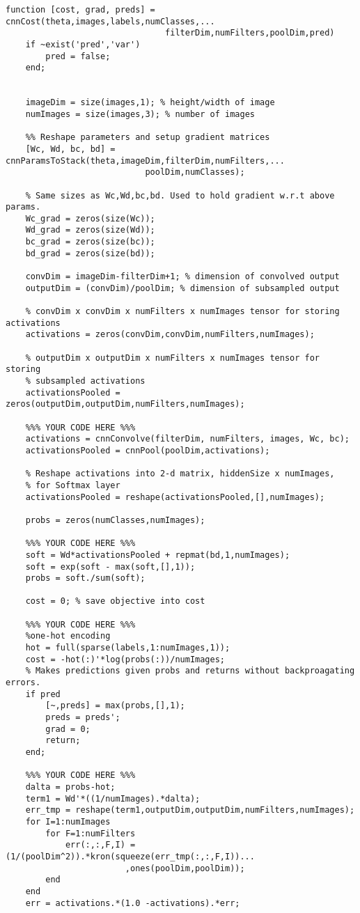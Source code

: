 \documentclass[12pt] {article}
\begin{document}
\begin{lstlisting}
function [cost, grad, preds] = cnnCost(theta,images,labels,numClasses,...
                                filterDim,numFilters,poolDim,pred)
	if ~exist('pred','var')
    	pred = false;
	end;


	imageDim = size(images,1); % height/width of image
	numImages = size(images,3); % number of images

	%% Reshape parameters and setup gradient matrices
	[Wc, Wd, bc, bd] = cnnParamsToStack(theta,imageDim,filterDim,numFilters,...
    	                    poolDim,numClasses);

	% Same sizes as Wc,Wd,bc,bd. Used to hold gradient w.r.t above params.
	Wc_grad = zeros(size(Wc));
	Wd_grad = zeros(size(Wd));
	bc_grad = zeros(size(bc));
	bd_grad = zeros(size(bd));

	convDim = imageDim-filterDim+1; % dimension of convolved output
	outputDim = (convDim)/poolDim; % dimension of subsampled output

	% convDim x convDim x numFilters x numImages tensor for storing activations
	activations = zeros(convDim,convDim,numFilters,numImages);

	% outputDim x outputDim x numFilters x numImages tensor for storing
	% subsampled activations
	activationsPooled = zeros(outputDim,outputDim,numFilters,numImages);

	%%% YOUR CODE HERE %%%
	activations = cnnConvolve(filterDim, numFilters, images, Wc, bc);
	activationsPooled = cnnPool(poolDim,activations);

	% Reshape activations into 2-d matrix, hiddenSize x numImages,
	% for Softmax layer
	activationsPooled = reshape(activationsPooled,[],numImages);

	probs = zeros(numClasses,numImages);

	%%% YOUR CODE HERE %%%
	soft = Wd*activationsPooled + repmat(bd,1,numImages);
	soft = exp(soft - max(soft,[],1));
	probs = soft./sum(soft);

	cost = 0; % save objective into cost

	%%% YOUR CODE HERE %%%
	%one-hot encoding 
	hot = full(sparse(labels,1:numImages,1));
	cost = -hot(:)'*log(probs(:))/numImages;
	% Makes predictions given probs and returns without backproagating errors.
	if pred
    	[~,preds] = max(probs,[],1);
	    preds = preds';
	    grad = 0;
	    return;
	end;

	%%% YOUR CODE HERE %%%
	dalta = probs-hot;
	term1 = Wd'*((1/numImages).*dalta);
	err_tmp = reshape(term1,outputDim,outputDim,numFilters,numImages);
	for I=1:numImages 
    	for F=1:numFilters        
	        err(:,:,F,I) = (1/(poolDim^2)).*kron(squeeze(err_tmp(:,:,F,I))...
            			,ones(poolDim,poolDim));        
    	end
	end
	err = activations.*(1.0 -activations).*err;


\end{lstlisting}
\end{document}
